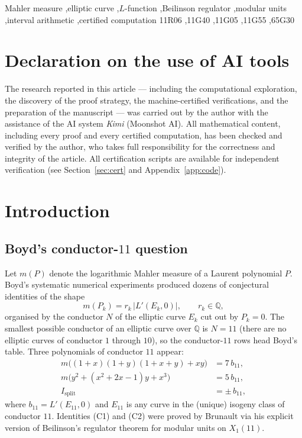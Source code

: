 \documentclass[preprint,12pt]{elsarticle}
\theoremstyle{definition}
\theoremstyle{remark}
\newcommand{\Q}{\mathbb{Q}}
\begin{document}
\begin{frontmatter}
\begin{keyword}
Mahler measure \sep elliptic curve \sep $L$-function \sep Beilinson
regulator \sep modular units \sep interval arithmetic \sep certified
computation
\MSC[2020] 11R06 \sep 11G40 \sep 11G05 \sep 11G55 \sep 65G30
\end{keyword}

\end{frontmatter}

\section*{Declaration on the use of AI tools}
The research reported in this article --- including the computational
exploration, the discovery of the proof strategy, the machine-certified
verifications, and the preparation of the manuscript --- was carried out
by the author with the assistance of the AI system \emph{Kimi}
(Moonshot AI). All mathematical content, including every proof and
every certified computation, has been checked and verified by the
author, who takes full responsibility for the correctness and integrity
of the article. All certification scripts are available for independent
verification (see Section~\ref{sec:cert} and Appendix~\ref{app:code}).

\tableofcontents

\section{Introduction}

\subsection{Boyd's conductor-\texorpdfstring{$11$}{11} question}

Let $m(P)$ denote the logarithmic Mahler measure of a Laurent polynomial $P$.
Boyd's systematic numerical experiments \cite{Boyd98,Boyd2015} produced dozens of
conjectural identities of the shape
\[
  m(P_k)=r_k\,|L'(E_k,0)|,\qquad r_k\in\Q,
\]
organised by the conductor $N$ of the elliptic curve $E_k$ cut out by
$P_k=0$. The smallest possible conductor of an elliptic curve over $\Q$ is
$N=11$ (there are no elliptic curves of conductor $1$ through $10$), so the
conductor-$11$ rows head Boyd's table. Three polynomials of conductor $11$
appear:
\begin{align}
  m\big((1+x)(1+y)(1+x+y)+xy\big)&=7\,b_{11}, \tag{C1}\\
  m\big(y^2+(x^2+2x-1)y+x^3\big)&=5\,b_{11}, \tag{C2}\\
  I_{\mathrm{split}}&=\pm\,b_{11}, \tag{C3}
\end{align}
where $b_{11}=L'(E_{11},0)$ and $E_{11}$ is any curve in the (unique)
isogeny class of conductor $11$. Identities (C1) and (C2) were proved by
Brunault \cite{Brunault} via his explicit version of Beilinson's regulator
theorem for modular units on $X_1(11)$.
\end{document}
